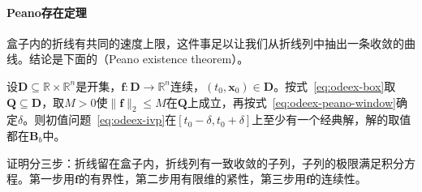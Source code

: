 \paragraph{Peano存在定理}
盒子内的折线有共同的速度上限，这件事足以让我们从折线列中抽出一条收敛的曲线。结论是下面的（Peano existence theorem）。

\begin{theorem}[Peano存在定理]
\label{thm:odeex-peano}
设$\bm{D}\subseteq\mathbb{R}\times\mathbb{R}^{n}$是开集，$\bm{f}:\bm{D}\to\mathbb{R}^{n}$连续，$(t_0,\bm{x}_0)\in\bm{D}$。按式~\eqref{eq:odeex-box}取$\bm{Q}\subseteq\bm{D}$，取$M>0$使$\lVert\bm{f}\rVert_2\leq M$在$\bm{Q}$上成立，再按式~\eqref{eq:odeex-peano-window}确定$\delta$。则初值问题~\eqref{eq:odeex-ivp}在$[t_0-\delta,t_0+\delta]$上至少有一个经典解，解的取值都在$\bm{B}_b$中。
\end{theorem}

证明分三步：折线留在盒子内，折线列有一致收敛的子列，子列的极限满足积分方程。第一步用$\bm{f}$的有界性，第二步用有限维的紧性，第三步用$\bm{f}$的连续性。

